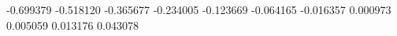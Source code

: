 -0.699379
-0.518120
-0.365677
-0.234005
-0.123669
-0.064165
-0.016357
0.000973
0.005059
0.013176
0.043078
